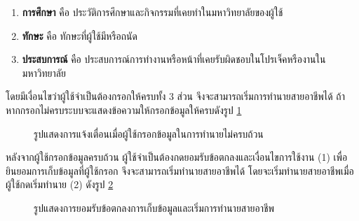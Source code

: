 \begin{enumerate}
    \item \textbf{การศึกษา} คือ ประวัติการศึกษาและกิจกรรมที่เคยทำในมหาวิทยาลัยของผู้ใช้
    \item \textbf{ทักษะ} คือ ทักษะที่ผู้ใช้มีหรือถนัด
    \item \textbf{ประสบการณ์} คือ ประสบการณ์การทำงานหรือหน้าที่เคยรับผิดชอบในโปรเจ็คหรืองานในมหาวิทยาลัย
\end{enumerate}

โดยมีเงื่อนไขว่าผู้ใช้จำเป็นต้องกรอกให้ครบทั้ง 3 ส่วน จึงจะสามารถเริ่มการทำนายสายอาชีพได้ ถ้าหากกรอกไม่ครบระบบจะแสดงข้อความให้กรอกข้อมูลให้ครบดังรูป \ref{fig:warning-CP}
\begin{figure}[H]\centering
    \caption{รูปแสดงการแจ้งเตื่อนเมื่อผู้ใช้กรอกข้อมูลในการทำนายไม่ครบถ้วน}\label{fig:warning-CP}
\end{figure}
หลังจากผู้ใช้กรอกข้อมูลครบถ้วน ผู้ใช้จำเป็นต้องกดยอมรับข้อตกลงและเงื่อนไขการใช้งาน (1) เพื่อยินยอมการเก็บข้อมูลที่ผู้ใช้กรอก จึงจะสามารถเริ่มทำนายสายอาชีพได้ โดยจะเริ่มทำนายสายอาชีพเมื่อผู้ใช้กดเริ่มทำนาย (2) ดังรูป \ref{fig:accept-CP}
\begin{figure}[H]\centering
    \caption{รูปแสดงการยอมรับข้อตกลงการเก็บข้อมูลและเริ่มการทำนายสายอาชีพ}\label{fig:accept-CP}
\end{figure}

